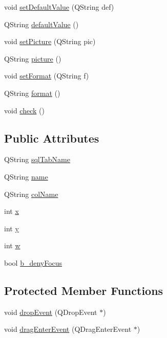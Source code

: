 \begin{DoxyCompactItemize}
void \hyperlink{classLineEdit_a65785ee018716e1d1f3145070de82aba}{setDefaultValue} (QString def)
\item 
QString \hyperlink{classLineEdit_ab812bc7b7f6ff4df6f0978b2a10affca}{defaultValue} ()
\item 
void \hyperlink{classLineEdit_a28de25ae19583ad6446fd57f4d7d80a5}{setPicture} (QString pic)
\item 
QString \hyperlink{classLineEdit_afa2599d7285a22ead9fc92f8277a3f99}{picture} ()
\item 
void \hyperlink{classLineEdit_ab1d9a17ce52c3bceb98ef4536e107dbe}{setFormat} (QString f)
\item 
QString \hyperlink{classLineEdit_a748da55fa9586cd430c4ed68bf5f7219}{format} ()
\item 
void \hyperlink{classLineEdit_add02ad1ab2af8928e3245f44fa62c071}{check} ()
\end{DoxyCompactItemize}
\subsection*{Public Attributes}
\begin{DoxyCompactItemize}
\item 
QString \hyperlink{classLineEdit_ac7a4f4fcd5b7f40f66c47ff64d66f7ec}{sqlTabName}
\item 
QString \hyperlink{classLineEdit_a337f64c9e882f065b5771f9e2289784f}{name}
\item 
QString \hyperlink{classLineEdit_a18b45b2581575cf88489ab3a6f15281f}{colName}
\item 
int \hyperlink{classLineEdit_a8a3d3eb982e8a27cc6bdbf3664330bb4}{x}
\item 
int \hyperlink{classLineEdit_aa6005ddcc5167be3d2d3d73e869dd434}{y}
\item 
int \hyperlink{classLineEdit_a9ac1b912bc68696a166d681a5b86dbf2}{w}
\item 
bool \hyperlink{classLineEdit_a4769336d33259d543b795da2831fe4f7}{b\_\-denyFocus}
\end{DoxyCompactItemize}
\subsection*{Protected Member Functions}
\begin{DoxyCompactItemize}
\item 
void \hyperlink{classLineEdit_a4aea170d9ee45df41951a8565b4a8d9a}{dropEvent} (QDropEvent $\ast$)
\item 
void \hyperlink{classLineEdit_afa85c9e14cc728c93cfa848af50c2762}{dragEnterEvent} (QDragEnterEvent $\ast$)
\end{DoxyCompactItemize}
